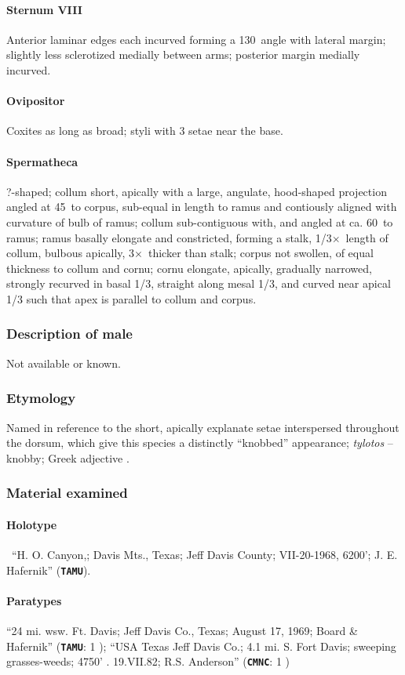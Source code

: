 \documentclass[fleqn,10pt,lineno]{wlpeerj} %
\newcommand{\td}{\textdegree~}
\newcommand{\x}{$\times$~}
\begin{document}
			\paragraph{Sternum VIII}
				Anterior laminar edges each incurved forming a 130\td angle with lateral margin; slightly less sclerotized medially between arms; posterior margin medially incurved.
			\paragraph{Ovipositor}
				Coxites as long as broad; styli with 3 setae near the base.
			\paragraph{Spermatheca}
				?-shaped; collum short, apically with a large, angulate, hood-shaped projection angled at 45\td to corpus, sub-equal in length to ramus and contiously aligned with curvature of bulb of ramus; collum sub-contiguous with, and angled at ca. 60\td to ramus; ramus basally elongate and constricted, forming a stalk, 1/3\x length of collum, bulbous apically, 3\x thicker than stalk; corpus not swollen, of equal thickness to collum and cornu; cornu elongate, apically, gradually narrowed, strongly recurved in basal 1/3, straight along mesal 1/3, and curved near apical 1/3 such that apex is parallel to collum and corpus.
		\subsubsection*{Description of male}
			Not available or known.
		\subsubsection*{Etymology}
			Named in reference to the short, apically explanate setae interspersed throughout the dorsum, which give this species a distinctly ``knobbed'' appearance; \textit{tylotos} -- knobby; Greek adjective \citep{brown1956}.
		\subsubsection*{Material examined}
			\paragraph{Holotype}
				\female~``H. O. Canyon,; Davis Mts., Texas; Jeff Davis County; VII-20-1968, 6200'; J. E. Hafernik'' (\texttt{\textbf{TAMU}}).
			\paragraph{Paratypes}
				``24 mi. wsw. Ft. Davis; Jeff Davis Co., Texas; August 17, 1969; Board \& Hafernik'' (\texttt{\textbf{TAMU}}: 1 \female);
				``USA Texas Jeff Davis Co.; 4.1 mi. S. Fort Davis; sweeping grasses-weeds; 4750' . 19.VII.82; R.S. Anderson'' (\texttt{\textbf{CMNC}}: 1 \female)
\end{document}
